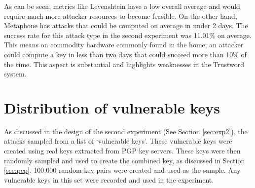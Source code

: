 \begin{table}[!h]
    \caption{Each metric's average number of near-collision keys and average compute times}
    \label{tab:average_perm}
\end{table}

As can be seen, metrics like Levenshtein have a low overall average and would require much more attacker resources to become feasible. On the other hand, Metaphone has attacks that could be computed on average in under 2 days. The success rate for this attack type in the second experiment was 11.01\% on average. This means on commodity hardware commonly found in the home; an attacker could compute a key in less than two days that could succeed more than 10\% of the time. This aspect is substantial and highlights weaknesses in the Trustword system.

\section{Distribution of vulnerable keys}
\label{sec:vulnKeys}
As discussed in the design of the second experiment (See Section \ref{sec:exp2}), the attacks sampled from a list of `vulnerable keys'. These vulnerable keys were created using real keys extracted from PGP key servers. These keys were then randomly sampled and used to create the combined key, as discussed in Section \ref{sec:pep}. 100,000 random key pairs were created and used as the sample\cite{davidnorman_2019}. Any vulnerable keys in this set were recorded and used in the experiment.

